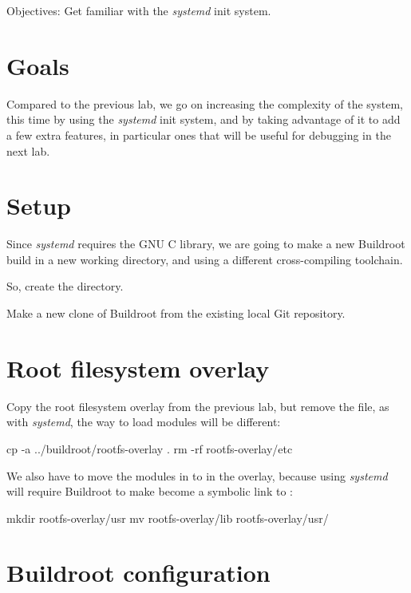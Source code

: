   {Objectives: Get familiar with the {\em systemd} init system.}

\section{Goals}

Compared to the previous lab, we go on increasing the complexity
of the system, this time by using the {\em systemd} init system,
and by taking advantage of it to add a few extra features, in particular
ones that will be useful for debugging in the next lab.

\section{Setup}

Since {\em systemd} requires the GNU C library, we are going
to make a new Buildroot build in a new working directory, and
using a different cross-compiling toolchain.

So, create the  directory.

Make a new clone of Buildroot from the existing local Git repository.

\section{Root filesystem overlay}

Copy the root filesystem overlay from the previous lab, but remove
the  file, as with {\em systemd}, the
way to load modules will be different:

\begin{bashinput}
cp -a ../buildroot/rootfs-overlay .
rm -rf rootfs-overlay/etc
\end{bashinput}

We also have to move the modules in  to
 in the overlay, because using {\em systemd}
will require Buildroot to make  become a symbolic
link to :

\begin{bashinput}
mkdir rootfs-overlay/usr
mv rootfs-overlay/lib rootfs-overlay/usr/
\end{bashinput}

\section{Buildroot configuration}


